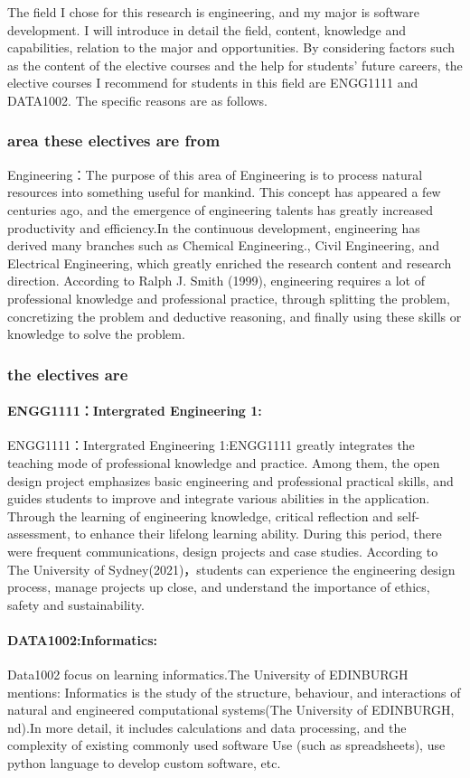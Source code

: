 \documentclass[../draft.tex]{subfiles}
\begin{document}
The field I chose for this research is engineering, and my major is software development. I will introduce in detail the field, content, knowledge and capabilities, relation to the major and opportunities. By considering factors such as the content of the elective courses and the help for students' future careers, the elective courses I recommend for students in this field are ENGG1111 and DATA1002. The specific reasons are as follows.
\subsubsection{area these electives are from}
Engineering：The purpose of this area of Engineering is to process natural resources into something useful for mankind. This concept has appeared a few centuries ago, and 
the emergence of engineering talents has greatly increased productivity and efficiency.In the continuous development, engineering has derived many branches such as Chemical Engineering., Civil Engineering, and Electrical Engineering, which greatly enriched the research content and research direction. According to Ralph J. Smith (1999), engineering requires a lot of professional knowledge and professional practice, through splitting the problem, concretizing the problem and deductive reasoning, and finally using these skills or knowledge to solve the problem.
\subsubsection{the electives are}
\paragraph{ENGG1111：Intergrated Engineering 1:} 
ENGG1111：Intergrated Engineering 1:ENGG1111 greatly integrates the teaching mode of professional knowledge and practice. Among them, the open design project emphasizes basic engineering and professional practical skills, and guides students to improve and integrate various abilities in the application. Through the learning of engineering knowledge, critical reflection and self-assessment, to enhance their lifelong learning ability. During this period, there were frequent communications, design projects and case studies. According to The University of Sydney(2021)，students can experience the engineering design process, manage projects up close, and understand the importance of ethics, safety and sustainability.
\paragraph{DATA1002:Informatics:}
Data1002 focus on learning informatics.The University of EDINBURGH mentions: Informatics is the study of the structure, behaviour, and interactions of natural and engineered computational systems(The University of EDINBURGH, nd).In more detail, it includes calculations and data processing, and the complexity of existing commonly used software Use (such as spreadsheets), use python language to develop custom software, etc. 
\end{document}
